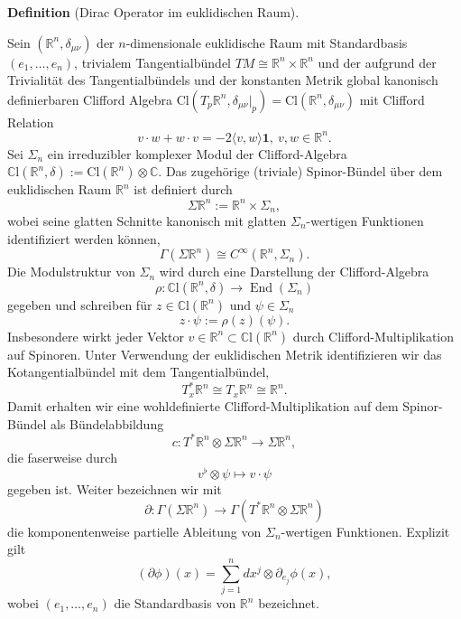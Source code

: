 \documentclass[10pt, letterpaper]{article}
\newcommand{\R}{\mathbb{R}}
\newcommand{\C}{\mathbb{C}}
\newcommand{\Cl}{\mathrm{Cl}}
\newcommand{\CustomHeading}[3]{%
  \par\medskip\noindent%
  \textbf{#1 #2} \textnormal{(#3)}.\enskip%
}
\newenvironment{DEF}[2]{\CustomHeading{Definition}{#1}{#2}}{}
\begin{document}
\begin{DEF}{}{Dirac Operator im euklidischen Raum}
  Sein $(\R^n,\delta_{\mu\nu})$ der $n$-dimensionale euklidische Raum mit Standardbasis $(e_1,…,e_n)$, trivialem Tangentialbündel $TM\cong \R^{n}\times \R^n$ und der aufgrund der Trivialität des Tangentialbündels und der konstanten Metrik global kanonisch definierbaren Clifford Algebra $\Cl(T_p\R^n,\delta_{\mu\nu}|_p)=\Cl(\R^n,\delta_{\mu\nu})$ mit Clifford Relation 
  $$v\cdot w + w \cdot v =-2 \langle v,w \rangle \mathbf{1},\ v,w\in\R^n.$$
  Sei $\Sigma_n$ ein irreduzibler komplexer Modul der Clifford-Algebra
  $\C\mathrm{l}\left(\mathbb{R}^n, \delta\right):=\Cl(\R^n)\otimes \C$.
  Das zugehörige (triviale) Spinor-Bündel über dem euklidischen Raum $\mathbb{R}^n$ ist definiert durch
  $$
  \Sigma \mathbb{R}^n:=\mathbb{R}^n \times \Sigma_n,
  $$
  wobei seine glatten Schnitte kanonisch mit glatten $\Sigma_n$-wertigen Funktionen identifiziert werden können,
  $$
  \Gamma\left(\Sigma \mathbb{R}^n\right) \cong C^{\infty}\left(\mathbb{R}^n, \Sigma_n\right) .
  $$
  Die Modulstruktur von $\Sigma_n$ wird durch eine Darstellung der Clifford-Algebra
  $$
  \rho: \C\mathrm{l}\left(\mathbb{R}^n, \delta\right) \longrightarrow \operatorname{End}\left(\Sigma_n\right)
  $$
  gegeben und schreiben für $z \in \C\mathrm{l}\left(\mathbb{R}^n\right)$ und $\psi \in \Sigma_n$
  $$
  z \cdot \psi:=\rho(z)(\psi) .
  $$
  Insbesondere wirkt jeder Vektor $v \in \mathbb{R}^n \subset \C\mathrm{l}\left(\mathbb{R}^n\right)$ durch Clifford-Multiplikation auf Spinoren.
  Unter Verwendung der euklidischen Metrik identifizieren wir das Kotangentialbündel mit dem Tangentialbündel,
  $$
  T_x^* \mathbb{R}^n \cong T_x \mathbb{R}^n \cong \mathbb{R}^n .
  $$
  Damit erhalten wir eine wohldefinierte Clifford-Multiplikation auf dem Spinor-Bündel als Bündelabbildung
  $$
  c: T^* \mathbb{R}^n \otimes \Sigma \mathbb{R}^n \longrightarrow \Sigma \mathbb{R}^n,
  $$
  die faserweise durch
  $$
  v^\flat \otimes \psi \mapsto v \cdot \psi
  $$
  gegeben ist. Weiter bezeichnen wir mit
  $$
  \partial: \Gamma\left(\Sigma \mathbb{R}^n\right) \longrightarrow \Gamma\left(T^* \mathbb{R}^n \otimes \Sigma \mathbb{R}^n\right)
  $$
  die komponentenweise partielle Ableitung von $\Sigma_n$-wertigen Funktionen. Explizit gilt
  $$
  (\partial \phi)(x)=\sum_{j=1}^n d x^j \otimes \partial_{e_j} \phi(x),
  $$
  wobei $\left(e_1, \ldots, e_n\right)$ die Standardbasis von $\mathbb{R}^n$ bezeichnet.
  

\end{DEF}
\end{document}
